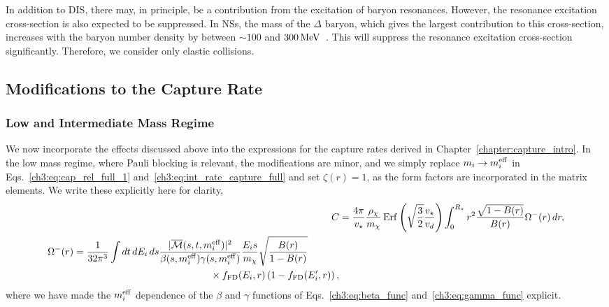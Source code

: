 In addition to DIS, there may, in principle, be a contribution from the excitation of baryon resonances.  However, the resonance excitation cross-section is also expected to be suppressed. In NSs, the mass of the $\Delta$ baryon, which gives the largest contribution to this cross-section, increases with the baryon number density by between $\sim100$ and $300 {\rm \,MeV}$~\cite{Motta:2019ywl_Deltabaryonsplay}. This will suppress the resonance excitation cross-section significantly. Therefore, we consider only elastic collisions. 


\subsection{Modifications to the Capture Rate}
\label{ch5:subsection:capture_modification}
\subsubsection{Low and Intermediate Mass Regime}
We now incorporate the effects discussed above into the expressions for the capture rates derived in Chapter~\ref{chapter:capture_intro}. In the low mass regime, where Pauli blocking is relevant, the modifications are minor, and we simply replace $m_i\rightarrow m_i^{\rm eff}$ in Eqs.~\ref{ch3:eq:cap_rel_full_1} and~\ref{ch3:eq:int_rate_capture_full} and set $\zeta(r) = 1$, as the form factors are incorporated in the matrix elements. We write these explicitly here for clarity,
% 
\begin{align}
   C & =\frac{4\pi}{v_\star}\frac{\rho_\chi}{m_\chi} \erf\left(\sqrt{\frac{3}{2}}\frac{v_\star}{v_d}\right) \int_0^{R_\star}  r^2\frac{\sqrt{1 - B(r)}}{B(r)}\Omega^-(r)\,dr,
   \label{ch5:eq:cap_general}\\
   \begin{split}
      \Omega^-(r) & = \frac{1}{32\pi^3}\int dt\,d\Ei\,ds \frac{|\overline{\mathcal{M}}(s, t, \mbeff)|^2}{\beta(s, \mbeff)\gamma(s, \mbeff)}\frac{\Ei s}{m_\chi}\sqrt{\frac{B(r)}{1 - B(r)}}\\
      &\hspace{14em} \times \fFD(\Ei, r)\left( 1 - \fFD(\Ei', r)\right),
   \end{split}
   \label{ch5:eq:omega_meff_low}
\end{align}
where we have made the $m_i^{\rm eff}$ dependence of the $\beta$ and $\gamma$ functions of Eqs.~\ref{ch3:eq:beta_func} and~\ref{ch3:eq:gamma_func} explicit. 

